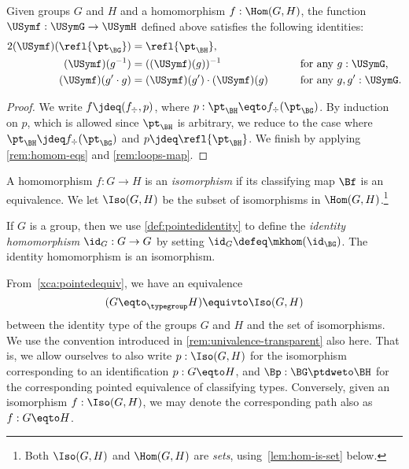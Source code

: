 \begin{lemma}\label{lem:grouphomomaxioms}
  Given groups $G$ and $H$ and a homomorphism $f : \Hom(G,H)$, the function $\USymf : \USymG \to \USymH$ defined above satisfies
  the following identities:
  \begin{alignat}2
    \label{gp-homo-unit} (\USymf) ( \refl {\pt_{\BG}} )
    &= \refl{\pt_{\BH}},   &\qquad&                                        \\
    \label{gp-homo-comp} (\USymf) (g ^ {-1})
    &= ((\USymf) (g))^{-1}                   && \text{for any $g : \USymG$,} \\
    \label{gp-homo-inv}  (\USymf) (g' \cdot g)
    &=  (\USymf) (g') \cdot  (\USymf) (g) && \text{for any $g, g' : \USymG$.}
  \end{alignat}
\end{lemma}

\begin{proof}
  We write $f \jdeq (f_\div,p)$, where $p : \pt_{\BH} \eqto f_\div (\pt_{\BG})$.
  By induction on $p$, which is allowed since $\pt_{\BH}$ is arbitrary,
  we reduce to the case where $\pt_{\BH} \jdeq f_\div (\pt_{\BG})$
  and $p\jdeq \refl{\pt_{\BH}}$.
  We finish by applying \cref{rem:homom-eqs} and \ref{rem:loops-map}.
\end{proof}

\begin{definition}\label{def:groupisomorphism}
  A homomorphism $f : G\to H$ is an \emph{isomorphism} if its classifying map $\Bf$ is an equivalence.
  We let $\Iso(G,H)$ be the subset of isomorphisms in $\Hom(G, H)$.\footnote{%
    Both $\Iso(G,H)$ and $\Hom(G,H)$ are \emph{sets},
    using~\cref{lem:hom-is-set} below.}
\end{definition}

\begin{definition}\label{def:identity-group-homomorphism}
  If $G$ is a group, then we use \cref{def:pointedidentity} to define the \emph{identity homomorphism} $\id_G : G\to G$ by
  setting $\id_G \defeq \mkhom (\id_\BG)$.  The
  identity homomorphism is an isomorphism.
\end{definition}

\begin{remark}
  \label{remark:groupsasunivalenttype} From~\cref{xca:pointedequiv},
  we have an equivalence
  \[
    (G\eqto_\typegroup H)\equivto \Iso(G,H)
  \]
  between the identity type of the groups $G$ and $H$ and the 
  set of isomorphisms. We use the convention introduced in
  \cref{rem:univalence-transparent} also here. That is,
  we allow ourselves to also write $p : \Iso(G,H)$ for the isomorphism
  corresponding to an identification $p:G\eqto H$,
  and $\Bp : \BG \ptdweto \BH$ for the corresponding pointed equivalence
  of classifying types. Conversely, given an isomorphism
  $f : \Iso(G,H)$, we may denote the corresponding path
  also as $f:G\eqto H$.
\end{remark}


